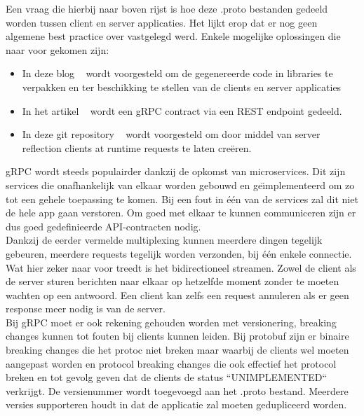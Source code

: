 Een vraag die hierbij naar boven rijst is hoe deze .proto bestanden gedeeld worden tussen client en server applicaties.
Het lijkt erop dat er nog geen algemene best practice over vastgelegd werd. Enkele mogelijke oplossingen
die naar voor gekomen zijn:
\begin{itemize}
    \item In deze blog ~\parencite{protofilesharingSol1} wordt voorgesteld om de gegenereerde code in libraries te verpakken en ter beschikking te stellen van de clients en server applicaties
    \item In het artikel ~\parencite{protofilesharingSol2} wordt een gRPC contract via een REST endpoint gedeeld.
    \item In deze git repository ~\parencite{protofilesharingSol3} wordt voorgesteld om door middel van server reflection clients at runtime requests te laten cre\"eren.
\end{itemize}

gRPC wordt steeds populairder dankzij de opkomst van microservices. Dit zijn services die onafhankelijk van elkaar worden gebouwd en ge\"{\i}mplementeerd om
zo tot een gehele toepassing te komen. Bij een fout in één van de services zal dit niet de hele app gaan verstoren.
Om goed met elkaar te kunnen communiceren zijn er dus goed gedefinieerde API-contracten nodig.\newline
~\autocite{microsoft}\\

Dankzij de eerder vermelde multiplexing kunnen meerdere dingen tegelijk gebeuren, meerdere requests tegelijk worden verzonden, bij één enkele connectie.
Wat hier zeker naar voor treedt is het bidirectioneel streamen. Zowel de client als de server sturen berichten naar elkaar op hetzelfde moment zonder te moeten wachten
op een antwoord. Een client kan zelfs een request annuleren als er geen response meer nodig is van de server.\newline
~\autocite{freecodecamp}\\

Bij gRPC moet er ook rekening gehouden worden met versionering, breaking changes kunnen tot fouten bij clients kunnen leiden.
Bij protobuf zijn er binaire breaking changes die het protoc niet breken maar waarbij de clients wel moeten aangepast worden en protocol breaking changes
die ook effectief het protocol breken en tot gevolg geven dat de clients de status ``UNIMPLEMENTED`` verkrijgt. De versienummer wordt toegevoegd aan
het .proto bestand. Meerdere versies supporteren houdt in dat de applicatie zal moeten gedupliceerd worden.\\

